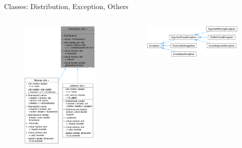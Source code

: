 \documentclass[8pt]{beamer}
\begin{document}
\begin{frame}{Classes: Distribution, Exception, Others}
    \begin{columns}
         {
            \centering
            \begin{figure} \centering \includegraphics[width=\textwidth]{img/uml_Distributions.png} \end{figure}
        }
         {
            \centering
            \begin{figure} \centering \includegraphics[width=\textwidth]{img/inherit_Exception.png} \end{figure}
}
\end{columns}
\end{frame}
\end{document}
